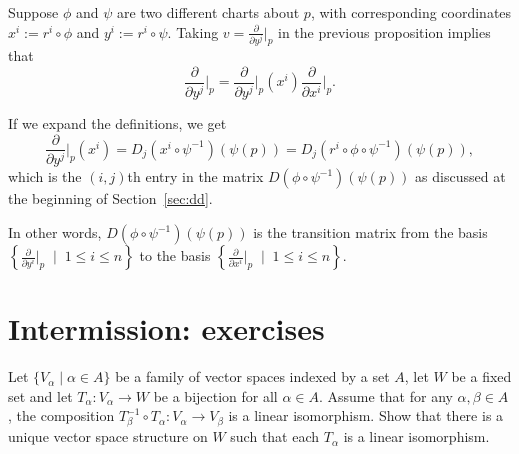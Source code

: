 \begin{rmk}
    Suppose $\phi$ and $\psi$ are two different charts about $p$, with corresponding coordinates $x^i := r^i \circ \phi$ and $y^i := r^i \circ \psi$.
    Taking $v = \frac{\partial}{\partial y^j}\Big|_p$ in the previous proposition implies that
    \begin{equation}
        \frac{\partial}{\partial y^j}\Big|_p = 
        \frac{\partial}{\partial y^j}\Big|_p (x^i) \frac{\partial}{\partial x^i}\Big|_p.
    \end{equation}

    If we expand the definitions, we get
    \begin{equation}
        \frac{\partial}{\partial y^j}\Big|_p (x^i) =
        D_j(x^i\circ\psi^{-1})(\psi(p)) =
        D_j(r^i \circ \phi \circ \psi^{-1})(\psi(p)),
    \end{equation}
    which is the $(i,j)$th entry in the matrix $D(\phi\circ\psi^{-1})(\psi(p))$ as discussed at the beginning of Section~\ref{sec:dd}.

    In other words, $D(\phi\circ\psi^{-1})(\psi(p))$ is the transition matrix from the basis $\left\{\frac{\partial}{\partial y^i}\Big|_p\;\mid\; 1\leq i\leq n\right\}$ to the basis $\left\{\frac{\partial}{\partial x^i}\Big|_p\;\mid\; 1\leq i\leq n\right\}$.
\end{rmk}

\section{Intermission: exercises}
\TODO

\begin{exe}
    Let $\{V_\alpha \mid \alpha\in A\}$ be a family of vector spaces indexed by a set $A$, let $W$ be a fixed set and let $T_\alpha: V_\alpha\to W$ be a bijection for all $\alpha\in A$.
    Assume that for any $\alpha, \beta \in A$, the composition $T_\beta^{-1}\circ T_\alpha : V_\alpha \to V_\beta$ is a linear isomorphism.
    Show that there is a unique vector space structure on $W$ such that each $T_\alpha$ is a linear isomorphism.
\end{exe}

